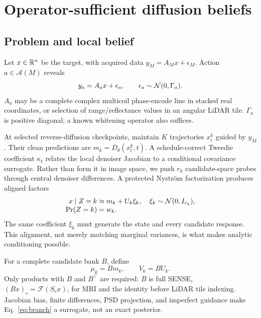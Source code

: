 \section{Operator-sufficient diffusion beliefs}
\label{sec:method}

\subsection{Problem and local belief}

Let $x\in\mathbb{R}^n$ be the target, with acquired data
$y_M=A_Mx+\epsilon_M$.  Action $a\in\mathcal A(M)$ reveals
\begin{equation}
    y_a=A_ax+\epsilon_a,\qquad
    \epsilon_a\sim\mathcal{N}(0,\Gamma_a).
    \label{eq:action-model}
\end{equation}
$A_a$ may be a complete complex multicoil phase-encode line in stacked real
coordinates, or selection of range/reflectance values in an angular LiDAR
tile.  $\Gamma_a$ is positive diagonal; a known whitening operator also
suffices.

At selected reverse-diffusion checkpoints, maintain $K$ trajectories
$x_t^k$ guided by $y_M$.  Their clean predictions are
$m_k=D_\theta(x_t^k,t)$.  A schedule-correct Tweedie coefficient $\kappa_t$
relates the local denoiser Jacobian to a conditional covariance surrogate.
Rather than form it in image space, we push $r_k$ candidate-space probes
through central denoiser differences.  A protected Nystr\"om factorization
produces aligned factors
\begin{equation}
 \begin{aligned}
 x\mid Z=k &\approx m_k+U_k\xi_k,\quad
 \xi_k\sim\mathcal{N}(0,I_{r_k}),\\[-1mm]
 \Pr(Z=k)&=w_k .
 \end{aligned}
    \label{eq:branch}
\end{equation}
The same coefficient $\xi_k$ must generate the state and every candidate
response.  This alignment, not merely matching marginal variances, is what
makes analytic conditioning possible.

For a complete candidate bank $B$, define
\begin{equation}
    \mu_k=Bm_k,\qquad V_k=BU_k.
    \label{eq:bank}
\end{equation}
Only products with $B$ and $B^\top$ are required: $B$ is full SENSE,
$(Bx)_c=\mathcal F(S_cx)$, for MRI and the identity before LiDAR tile
indexing.  Jacobian bias, finite differences, PSD projection, and imperfect
guidance make Eq.~\eqref{eq:branch} a surrogate, not an exact posterior.

